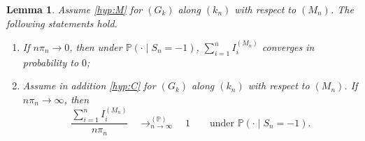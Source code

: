 \documentclass[a4paper,11pt]{article}
\newtheorem{lemma}[theorem]{Lemma}
\DeclareRobustCommand{\P}{\mathbb{P}}
\DeclareRobustCommand{\1}{\mathbf{1}}
\begin{document}
\begin{lemma}
\label{lem:extreme_means}
Assume \ref{hyp:M}  for $(G_{k})$  along $(k_{n})$ with respect to $(M_{n})$. The following statements hold. 
\begin{enumerate}[label=\textup{(\roman*)}]
\item  If $n\pi_n\to0$, then under $\P(\cdot\mid S_n=-1)$,
$\sum_{i=1}^n I_i^{(M_n)}$ converges in probability to $0$;
\item  Assume in addition \ref{hyp:C} for $(G_k)$  along $(k_{n})$ with respect to $(M_{n})$. If $n\pi_n\to\infty$, then $$ \frac{\sum_{i=1}^n I_i^{(M_n)}}{n\pi_n}  \quad \mathop{\longrightarrow}^{(\P)}_{n \rightarrow \infty} \quad1 \qquad \textrm{under } \P(\cdot\mid S_n=-1).$$
\end{enumerate}
\end{lemma}
\end{document}
